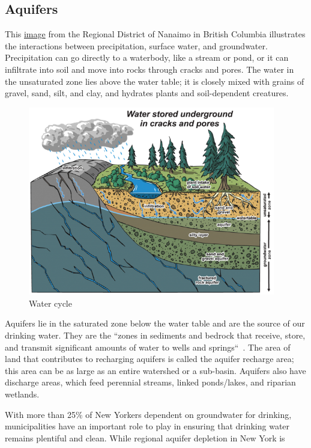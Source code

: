 \subsection*{Aquifers}\label{subsec:aquifers}
This \href{http://rdnwaterbudget.ca/water-101/aquifers-groundwater/}{image}
from the Regional District of Nanaimo in British Columbia 
illustrates the interactions between precipitation, surface water, and 
groundwater. Precipitation can go directly to a waterbody, like a stream or 
pond, or it can infiltrate into soil and move into rocks through cracks and 
pores. The water in the unsaturated zone lies above the water table; it is 
closely mixed with grains of gravel, sand, silt, and clay, and hydrates plants 
and soil-dependent creatures.
\par
\begin{figure}
    \includegraphics[width=10.8cm, keepaspectratio]{images/aquifers.png}
    \caption{Water cycle}
\end{figure}
Aquifers lie in the saturated zone below the water table and are the source of 
our drinking water. They are the ``zones in sediments and bedrock that 
receive, store, and transmit significant amounts of water to wells and 
springs``~\citep{haeckel2014}. The area of land that contributes to recharging 
aquifers is called the aquifer recharge area; this area can be as large as an 
entire watershed or a sub-basin. Aquifers also have discharge areas, which feed 
perennial streams, linked ponds/lakes, and riparian wetlands.
\par
With more than 25\% of New Yorkers dependent on groundwater for drinking, 
municipalities have an important role to play in ensuring that drinking water 
remains plentiful and clean. While regional aquifer depletion in New York is 
